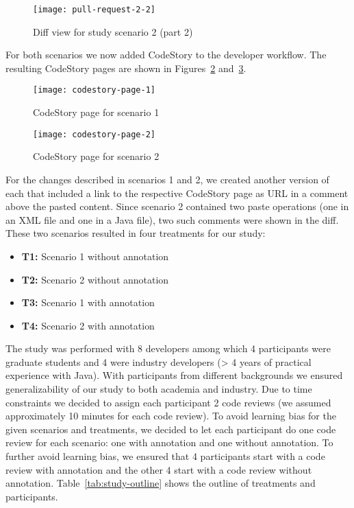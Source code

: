 \documentclass[../manifest.tex]{subfiles}
\begin{document}
\begin{figure}[h]
  \centering
  \texttt{[image: pull-request-2-2]}
  \caption{Diff view for study scenario 2 (part 2)}
  \label{fig:pull-request-2-2}
\end{figure}

For both scenarios we now added CodeStory to the developer workflow. The resulting CodeStory pages are shown in Figures~\ref{fig:codestory-page-1} and~\ref{fig:codestory-page-2}.

\begin{figure}[h]
  \centering
  \texttt{[image: codestory-page-1]}
  \caption{CodeStory page for scenario 1}
  \label{fig:codestory-page-1}
\end{figure}

\begin{figure}[h]
  \centering
  \texttt{[image: codestory-page-2]}
  \caption{CodeStory page for scenario 2}
  \label{fig:codestory-page-2}
\end{figure}

For the changes described in scenarios 1 and 2, we created another version of each that included a link to the respective CodeStory page as URL in a comment above the pasted content. Since scenario 2 contained two paste operations (one in an XML file and one in a Java file), two such comments were shown in the diff.
These two scenarios resulted in four treatments for our study:
\begin{itemize}
  \item \textbf{T1:} Scenario 1 without annotation
  \item \textbf{T2:} Scenario 2 without annotation
  \item \textbf{T3:} Scenario 1 with annotation
  \item \textbf{T4:} Scenario 2 with annotation
\end{itemize}

The study was performed with 8 developers among which 4 participants were graduate students and 4 were industry developers (> 4 years of practical experience with Java). With participants from different backgrounds we ensured generalizability of our study to both academia and industry. Due to time constraints we decided to assign each participant 2 code reviews (we assumed approximately 10 minutes for each code review). To avoid learning bias for the given scenarios and treatments, we decided to let each participant do one code review for each scenario: one with annotation and one without annotation. To further avoid learning bias, we ensured that 4 participants start with a code review with annotation and the other 4 start with a code review without annotation. Table~\ref{tab:study-outline} shows the outline of treatments and participants.
\end{document}
